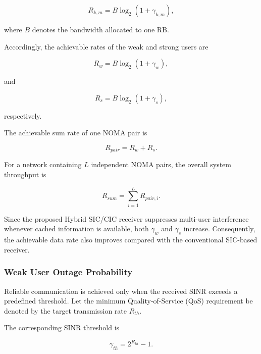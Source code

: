 \documentclass[12pt,a4paper]{article}
\begin{document}
\begin{equation}
R_{k,m}
=
B
\log_2
\left(
1+\gamma_{k,m}
\right),
\end{equation}

where $B$ denotes the bandwidth allocated to one RB.

Accordingly, the achievable rates of the weak and strong users are

\begin{equation}
R_w
=
B
\log_2
(1+\gamma_w),
\end{equation}

and

\begin{equation}
R_s
=
B
\log_2
(1+\gamma_s),
\end{equation}

respectively.

The achievable sum rate of one NOMA pair is

\begin{equation}
R_{pair}
=
R_w+R_s.
\end{equation}

For a network containing $L$ independent NOMA pairs, the overall system throughput is

\begin{equation}
R_{sum}
=
\sum_{i=1}^{L}
R_{pair,i}.
\end{equation}

Since the proposed Hybrid SIC/CIC receiver suppresses multi-user interference whenever cached information is available, both $\gamma_w$ and $\gamma_s$ increase. Consequently, the achievable data rate also improves compared with the conventional SIC-based receiver.

\subsubsection{Weak User Outage Probability}

Reliable communication is achieved only when the received SINR exceeds a predefined threshold. Let the minimum Quality-of-Service (QoS) requirement be denoted by the target transmission rate $R_{th}$.

The corresponding SINR threshold is

\begin{equation}
\gamma_{th}
=
2^{R_{th}}-1.
\end{equation}
\end{document}
